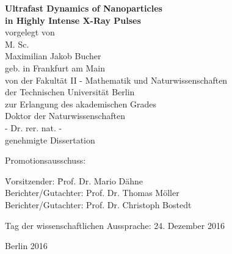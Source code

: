%
\begin{fullsizetitle}
\vspace{40mm}
\begin{center}
%
{\LARGE \textbf{Ultrafast Dynamics of Nanoparticles\\in Highly Intense X-Ray Pulses\vspace{20mm}\\}}%
{\large%
vorgelegt von
\vspace{4mm}\\
M. Sc.}%
\vspace{2mm}\\
%
{\Large Maximilian Jakob Bucher}
\vspace{4mm}\\
%
{\large geb. in Frankfurt am Main} %
\vspace{20mm}
\\
%
{\large %
von der Fakult\"{a}t II - Mathematik und Naturwissenschaften
\vspace{1mm}\\
der Technischen Universit\"{a}t Berlin
\vspace{1mm}\\
zur Erlangung des akademischen Grades
%
\vspace{5mm}
\\
%
Doktor der Naturwissenschaften
\vspace{1mm}\\
- Dr. rer. nat. -
%
\vspace{10mm}
\\
%
%
genehmigte Dissertation
\vspace{10mm}}
\\
\end{center}
%
{\large%
\hspace{22mm}Promotionsausschuss:
%
%
\begin{tabbing}
%
\hspace{22mm}\= Vorsitzender:\hspace{20mm} \= Prof. Dr. Mario D\"{a}hne \\
\>Berichter/Gutachter: \> Prof. Dr. Thomas M\"{o}ller \\
\>Berichter/Gutachter: \> Prof. Dr. Christoph Bostedt
%
\end{tabbing}
%
\leavevmode
\hspace{22mm}Tag der wissenschaftlichen Aussprache: 24. Dezember 2016
}
%
\begin{center}
%
\vspace{20mm}
%
{\large %
Berlin 2016}
%
\end{center}
%
\end{fullsizetitle}
%
%